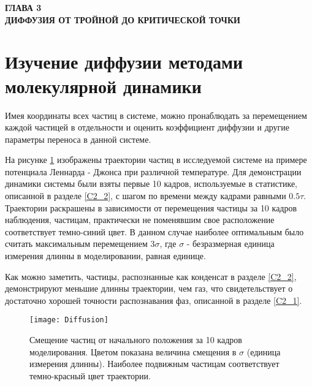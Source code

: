 
\newpage
\begin{center}
\textbf{ГЛАВА 3}\\
\textbf{ДИФФУЗИЯ ОТ ТРОЙНОЙ ДО КРИТИЧЕСКОЙ ТОЧКИ}
\end{center}




\section{Изучение диффузии методами молекулярной динамики}\label{C3_1}

Имея координаты всех частиц в системе, можно пронаблюдать за перемещением каждой частицей в отдельности и оценить коэффициент диффузии и другие параметры переноса в данной системе.

На рисунке \ref{risTreck} изображены траектории частиц в исследуемой системе на примере потенциала Леннарда - Джонса при различной температуре.  Для демонстрации динамики системы были взяты первые 10 кадров, используемые в статистике, описанной в разделе \ref{C2_2}, с шагом по времени между кадрами равными $0.5\tau$. Траектории раскрашены в зависимости от перемещения частицы за 10 кадров наблюдения, частицам, практически не поменявшим свое расположение соответствует темно-синий цвет. В данном случае наиболее оптимальным было считать максимальным перемещением $3\sigma$, где $\sigma$ - безразмерная единица измерения длинны в моделировании, равная единице.

Как можно заметить, частицы, распознанные как конденсат в разделе \ref{C2_2}, демонстрируют меньшие длинны траектории, чем газ, что свидетельствует о достаточно хорошей точности распознавания фаз, описанной в разделе \ref{C2_1}. 

\begin{figure}[htbp!]
\begin{center}
\texttt{[image: Diffusion]}
\caption{Смещение частиц от начального положения за 10 кадров моделирования. Цветом показана величина смещения в $\sigma$ (единица измерения длинны). Наиболее подвижным частицам соответствует темно-красный цвет траектории.}
\label{risTreck}
\end{center}
\end{figure}

